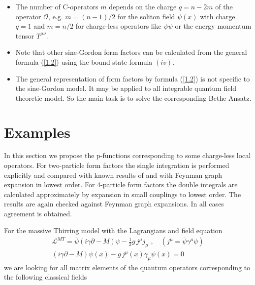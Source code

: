 \documentclass[a4paper,a4paper]{article}
\begin{document}
\begin{itemize}
\item  The number of C-operators $m$ depends on the charge $q=n-2m$ of the
operator $\mathcal{O}$, e.g. $m=(n-1)/2$ for the soliton field $\psi (x)$
with charge $q=1$ and $m=n/2$ for charge-less operators like $\overline{\psi 
}\psi $ or the energy momentum tensor $T^{\mu \nu }$.

\item  Note that other sine-Gordon form factors can be calculated from the
general formula (\ref{1.2}) using the bound state formula $(iv)$.

\item  The general representation of form factors by formula (\ref{1.2}) is
not specific to the sine-Gordon model. It may be applied to all integrable
quantum field theoretic model. So the main task is to solve the
corresponding Bethe Ansatz.
\end{itemize}

\section{Examples}

\label{s4}

In this section we propose the p-functions corresponding to some charge-less
local operators. For two-particle form factors the single integration is
performed explicitly and compared with known results of \cite{KW} and with
Feynman graph expansion in lowest order. For 4-particle form factors the
double integrals are calculated approximately by expansion in small
couplings to lowest order. The results are again checked against Feynman
graph expansions. In all cases agreement is obtained.

For the massive Thirring model with the Lagrangians and field equation 
\begin{gather*}
\mathcal{L}^{MT}=\overline{\psi }(i\gamma \partial -M)\psi -\tfrac{1}{2}%
g\,j^{\mu }j_{\mu }\,\,,\quad \left( j^{\mu }=\overline{\psi }\gamma ^{\mu
}\psi \right) \\
(i\gamma \partial -M)\psi (x)-g\,j^{\mu }(x)\gamma _{\mu }\psi (x)=0
\end{gather*}
we are looking for all matrix elements of the quantum operators
corresponding to the following classical fields
\end{document}
